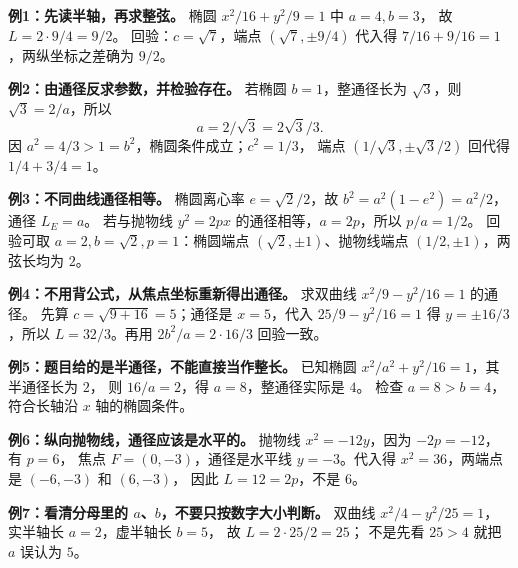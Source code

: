 \begin{examplebox}
\textbf{例1：先读半轴，再求整弦。} 椭圆 $x^2/16+y^2/9=1$ 中 $a=4,b=3$，
故 $\boxed{L=2\cdot9/4=9/2}$。
回验：$c=\sqrt7$，端点 $(\sqrt7,\pm9/4)$ 代入得 $7/16+9/16=1$，两纵坐标之差确为 $9/2$。

\medskip
\textbf{例2：由通径反求参数，并检验存在。}
若椭圆 $b=1$，整通径长为 $\sqrt3$，则 $\sqrt3=2/a$，所以
\[
 \boxed{a=2/\sqrt3=2\sqrt3/3}.
\]
因 $a^2=4/3>1=b^2$，椭圆条件成立；$c^2=1/3$，
端点 $(1/\sqrt3,\pm\sqrt3/2)$ 回代得 $1/4+3/4=1$。

\medskip
\textbf{例3：不同曲线通径相等。}
椭圆离心率 $e=\sqrt2/2$，故 $b^2=a^2(1-e^2)=a^2/2$，通径 $L_E=a$。
若与抛物线 $y^2=2px$ 的通径相等，$a=2p$，所以 $\boxed{p/a=1/2}$。
回验可取 $a=2,b=\sqrt2,p=1$：椭圆端点 $(\sqrt2,\pm1)$、抛物线端点 $(1/2,\pm1)$，两弦长均为 $2$。


\textbf{例4：不用背公式，从焦点坐标重新得出通径。}
求双曲线 $x^2/9-y^2/16=1$ 的通径。
先算 $c=\sqrt{9+16}=5$；通径是 $x=5$，代入
$25/9-y^2/16=1$ 得 $y=\pm16/3$，所以
$\boxed{L=32/3}$。再用 $2b^2/a=2\cdot16/3$ 回验一致。

\medskip
\textbf{例5：题目给的是半通径，不能直接当作整长。}
已知椭圆 $x^2/a^2+y^2/16=1$，其半通径长为 $2$，
则 $16/a=2$，得 $a=8$，整通径实际是 $\boxed{4}$。
检查 $a=8>b=4$，符合长轴沿 $x$ 轴的椭圆条件。

\medskip
\textbf{例6：纵向抛物线，通径应该是水平的。}
抛物线 $x^2=-12y$，因为 $-2p=-12$，有 $p=6$，
焦点 $F=(0,-3)$，通径是水平线 $y=-3$。代入得
$x^2=36$，两端点是 $(-6,-3)$ 和 $(6,-3)$，
因此 $\boxed{L=12=2p}$，不是 $6$。

\medskip
\textbf{例7：看清分母里的 $a$、$b$，不要只按数字大小判断。}
双曲线 $x^2/4-y^2/25=1$，实半轴长 $a=2$，虚半轴长 $b=5$，
故 $\boxed{L=2\cdot25/2=25}$；
不是先看 $25>4$ 就把 $a$ 误认为 $5$。

\end{examplebox}
\clearpage
